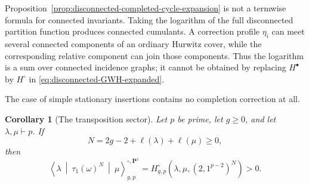 \documentclass[10pt,a4paper]{amsart}
\newtheorem{corollary}[theorem]{Corollary}
\numberwithin{equation}{section}
\begin{document}
Proposition~\ref{prop:disconnected-completed-cycle-expansion} is not a
termwise formula for connected invariants.  Taking the logarithm of the
full disconnected partition function produces connected cumulants.  A
correction profile $\eta_i$ can meet several connected components of an
ordinary Hurwitz cover, while the corresponding relative component can
join those components.  Thus the logarithm is a sum over connected
incidence graphs; it cannot be obtained by replacing $H^\bullet$ by
$H^\circ$ in \eqref{eq:disconnected-GWH-expanded}.

The case of simple stationary insertions contains no completion correction
at all.

\begin{corollary}[The transposition sector]
\label{cor:tau-one-positive}
Let $p$ be prime, let $g\geq0$, and let $\lambda,\mu\vdash p$.  If
\[
 N=2g-2+\ell(\lambda)+\ell(\mu)\geq0,
\]
then
\begin{equation}\label{eq:tau-one-Hurwitz}
 \left\langle\lambda\ \middle|\
   \tau_1(\omega)^N\
   \middle|\ \mu\right\rangle^{\circ,\mathbf P^1}_{g,p}
 =H^\circ_{g,p}
 \left(\lambda,\mu,(2,1^{p-2})^N\right)>0.
\end{equation}
\end{corollary}
\end{document}
